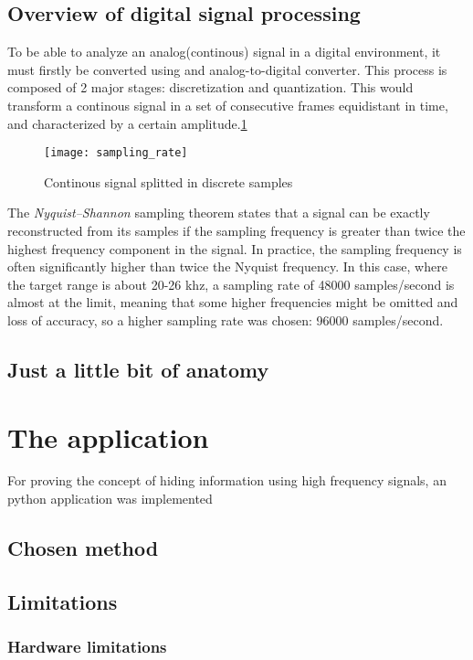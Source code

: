 \documentclass[12 pct]{report}
\begin{document}
\section{Overview of digital signal processing}
To be able to analyze an analog(continous) signal in a digital environment, it must firstly be converted using and analog-to-digital converter. This process is composed of 2 major stages: discretization and quantization. This would transform a continous signal in a set of consecutive frames equidistant in time, and characterized by a certain amplitude.\ref{fig:samp_rate}


\begin{figure}[h]
\texttt{[image: sampling\_rate]}
\centering
\label{fig:samp_rate}
\caption{Continous signal splitted in discrete samples}
\end{figure}

The \emph{Nyquist–Shannon} sampling theorem states that a signal can be exactly reconstructed from its samples if the sampling frequency is greater than twice the highest frequency component in the signal. In practice, the sampling frequency is often significantly higher than twice the Nyquist frequency\cite{note5}. In this case, where the target range is about 20-26 khz, a sampling  rate of 48000 samples/second is almost at the limit, meaning that some higher frequencies might be omitted and loss of accuracy, so a higher sampling rate was chosen: 96000 samples/second.


\section{Just a little bit of anatomy}

\chapter{The application}
For proving the concept of hiding information using high frequency signals, an python application was implemented
\section{Chosen method}


\section{Limitations}
\subsection{Hardware limitations}
\end{document}
